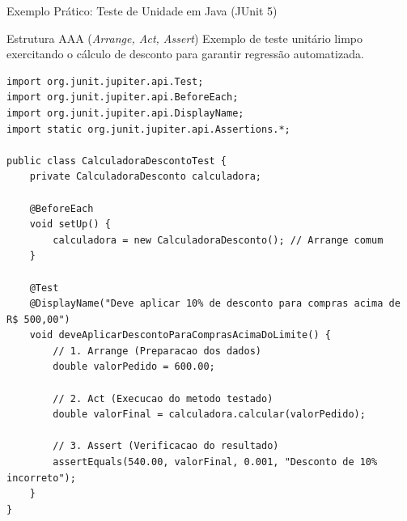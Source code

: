 \documentclass[aspectratio=169, 9pt]{beamer}
\begin{document}
\begin{frame}[fragile]{Exemplo Prático: Teste de Unidade em Java (JUnit 5)}
  \begin{block}{Estrutura AAA (\textit{Arrange, Act, Assert})}
    Exemplo de teste unitário limpo exercitando o cálculo de desconto para garantir regressão automatizada.
  \end{block}

  \begin{lstlisting}[style=javastyle]
import org.junit.jupiter.api.Test;
import org.junit.jupiter.api.BeforeEach;
import org.junit.jupiter.api.DisplayName;
import static org.junit.jupiter.api.Assertions.*;

public class CalculadoraDescontoTest {
    private CalculadoraDesconto calculadora;

    @BeforeEach
    void setUp() {
        calculadora = new CalculadoraDesconto(); // Arrange comum
    }

    @Test
    @DisplayName("Deve aplicar 10% de desconto para compras acima de R$ 500,00")
    void deveAplicarDescontoParaComprasAcimaDoLimite() {
        // 1. Arrange (Preparacao dos dados)
        double valorPedido = 600.00;

        // 2. Act (Execucao do metodo testado)
        double valorFinal = calculadora.calcular(valorPedido);

        // 3. Assert (Verificacao do resultado)
        assertEquals(540.00, valorFinal, 0.001, "Desconto de 10% incorreto");
    }
}
  \end{lstlisting}
\end{frame}
\end{document}
